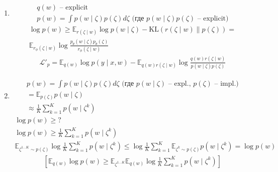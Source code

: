 \documentclass{book}
\begin{document}
\begin{enumerate}
\item \begin{gather*}
    q(w) \textrm{ -- explicit} \\
    p(w) = \int {p(w\mid \zeta)p(\zeta)d\zeta} \textrm{ (где $p(w\mid \zeta)p(\zeta)$ -- explicit)}
  \end{gather*}
  \begin{gather*}
    \log p(w) \geq \mathbb{E}_{r(\zeta\mid w)}\log p(w\mid \zeta)-
    \mathrm{KL}\left(r(\zeta\mid w)\|p(\zeta)\right)=\\
    \mathbb{E}_{r_\phi(\zeta \mid w)} \log \frac{p_\theta(w\mid \zeta)p_\theta(\zeta)}{r_\phi(\zeta\mid w)}
  \end{gather*}
  \begin{gather*}
    \mathcal{L}'_p=\mathbb{E}_{q(w)}\log p(y\mid x, w) - \mathbb{E}_{q(w)r(\zeta\mid w)}\log \frac{q(w)r(\zeta\mid w)}{p(w\mid \zeta)p(\zeta)}
  \end{gather*}

\item \begin{gather*}
    p(w)=\int {p(w\mid \zeta)p(\zeta)d\zeta}\textrm{ (где $p(w\mid \zeta)$ -- expl., $p(\zeta)$ -- impl.)}\\
    =\mathbb{E}_{p(\zeta)}p(w\mid\zeta)\\
    \approx \frac{1}{K}\sum_{k=1}^{K} {p(w\mid \zeta^k)}
\end{gather*}
\begin{gather*}
  \log p(w) \geq ?\\
  \log p(w) \geq \frac{1}{K}\sum_{k=1}^{K} {p(w\mid \zeta^k)}\\
  \mathbb{E}_{\zeta^{1\dots K} \sim p(\zeta)} \log \frac{1}{K} \sum_{k=1}^{K} {p(w\mid \zeta^k)}\leq
  \log\frac{1}{K}\sum_{k=1}^{K} {\mathbb{E}_{\zeta^{k} \sim p(\zeta)} p(w\mid \zeta^k)}=\log p(w)
\end{gather*}
\begin{gather*}
  \left[\mathbb{E}_{q(w)}\log p(w)\geq \mathbb{E}_{\zeta^{1\dots K}}\mathbb{E}_{q(w)}\log \frac{1}{K}\sum_{k=1}^{K} {p(w\mid \zeta^k)}\right]
\end{gather*}


\end{enumerate}
\end{document}
